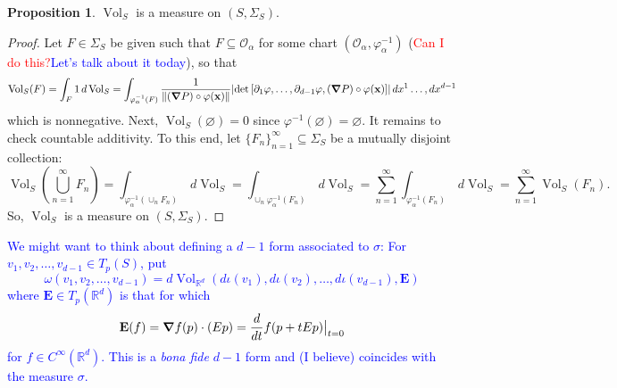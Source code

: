 \documentclass{article}
\theoremstyle{definition}
\renewcommand\det{\operatorname{det}}
\newcommand{\p}{\partial}
\newcommand{\al}{\alpha}
\newcommand{\f}[2]{\frac{#1}{#2}}
\newcommand{\lp}{\left(}
\newcommand{\rp}{\right)}
\theoremstyle{theorem}
\newtheorem{proposition}[theorem]{Proposition}
\newcommand{\Vol}{\operatorname{Vol}}
\begin{document}
\begin{proposition}
$\Vol_S$ is a measure on $(S,\Sigma_S)$. 
\end{proposition}
\begin{proof}
Let $F\in \Sigma_S$ be given such that $F\subseteq \mathcal{O_\al}$ for some chart $(\mathcal{O}_\al, \varphi_\al^{-1})$ (\textcolor{red}{Can I do this?}\textcolor{blue}{Let's talk about it today}), so that 
\begin{equation*}
    \Vol_S(F) = \int_F 1\,d\Vol_S = \int_{\varphi_\al^{-1}(F)}  \f{1}{\norm{(\grad P) \circ \varphi(\bf{x})}} \abs{\det{[ \p_1\varphi, \dots, \p_{d-1}\varphi, (\grad P) \circ \varphi(\bf{x})] }} \,dx^1\dots, dx^{d-1} 
\end{equation*}
which is nonnegative. Next, $\Vol_S(\varnothing) = 0$ since $\varphi^{-1}(\varnothing) = \varnothing$. It remains to check countable additivity. To this end, let $\{ F_n \}_{n=1}^\infty \subseteq \Sigma_S$ be a mutually disjoint collection:
\begin{equation*}
    \Vol_S\lp \bigcup_{n=1}^\infty F_n \rp 
    = \int_{\varphi_\al^{-1}(\cup_n F_n)} \,d\Vol_S =\int_{\cup_n \varphi_\al^{-1}(F_n)} \,d \Vol_S = \sum^\infty_{n = 1} \int_{\varphi_\al^{-1}(F_n)} \, d\Vol_S = \sum^\infty_{n=1} \Vol_S(F_n).
\end{equation*}
So, $\Vol_S$ is a measure on $(S,\Sigma_S) $.
\end{proof}
\textcolor{blue}{We might want to think about defining a $d-1$ form associated to $\sigma$: For $v_1,v_2,\dots,v_{d-1}\in T_p(S)$, put
\begin{equation*}
\omega(v_1,v_2,\dots,v_{d-1})=d\Vol_{\mathbb{R}^d}(d\iota(v_1),d\iota(v_2),\dots,d\iota(v_{d-1}),\mathbf{E})
\end{equation*}
where $\mathbf{E}\in T_p(\mathbb{R}^d)$ is that for which 
\begin{equation*}
\mathbf{E}(f)=\grad f(p)\cdot (Ep)=\frac{d}{dt}f(p+tEp)\big\vert_{t=0}
\end{equation*}
for $f\in C^{\infty}(\mathbb{R}^d)$. This is a \textit{bona fide} $d-1$ form and (I believe) coincides with the measure $\sigma$.}\\
\end{document}
